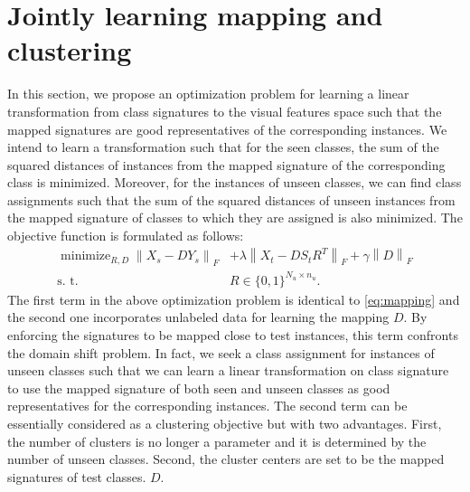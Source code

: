 \documentclass[10pt,twocolumn,letterpaper]{article}
\newcommand{\norm}[1]{\left \lVert #1 \right \rVert_{F}}
\DeclareMathOperator*{\minimize}{minimize}
\begin{document}
\section{Jointly learning mapping and clustering}
\label{joint}
 In this section, we propose an optimization problem for learning a linear transformation from class signatures to the visual features space such that the mapped signatures are good representatives of the corresponding instances.
 We intend to learn a transformation such that for the seen classes, the sum of the squared distances of instances from the mapped signature of the corresponding class is minimized. Moreover, for the instances of unseen classes, we can find class assignments such that the sum of the squared distances of unseen instances from the mapped signature of classes to which they are assigned is also minimized.
 The objective function is formulated as follows:
 \begin{align} \label{eq:main}
   \minimize_{R,D} \norm{X_s - D Y_s}  &+ \lambda \norm{X_t - D S_t R^T } + \gamma \norm{D} \\
   \text{s. t.} \quad & R \in \{0,1\}^{N_u \times n_u}. \nonumber
 \end{align}
The first term in the above optimization problem is identical to \eqref{eq:mapping} and the second one incorporates unlabeled data for learning the mapping $D$. By enforcing
 the signatures to be mapped close to test instances, this term confronts the domain shift problem. In fact, we seek a class assignment for instances of unseen classes such that we can learn a linear transformation on class signature to use the mapped signature of both seen and unseen classes as good representatives for the corresponding instances.
 The second term can be essentially considered as a clustering objective but with two advantages. First, the number of clusters is no longer a
 parameter and it is determined by the number of unseen classes. Second, the cluster centers are set to be the mapped signatures of test classes.
$D$.
\end{document}
